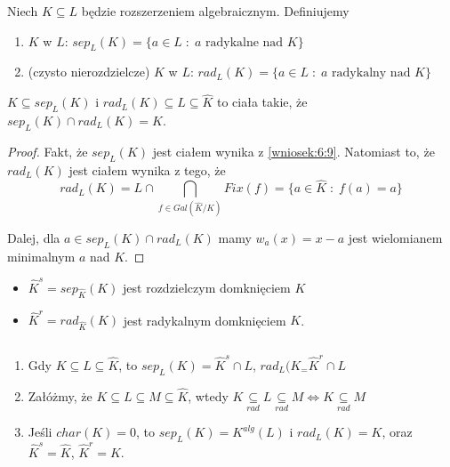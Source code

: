 \begin{bbox}
Niech $K\subseteq L$ będzie rozszerzeniem algebraicznym. Definiujemy
\begin{enumerate}
    \item {} $K$ w $L$: $sep_L(K)=\{a\in L\;:\;a\text{ radykalne nad } K\}$
    \item {} (czysto nierozdzielcze) $K$ w $L$: $rad_L(K)=\{a\in L\;:\;a\text{ radykalny nad }K\}$
\end{enumerate}
\end{bbox}

\begin{conclusion}
$K\subseteq sep_L(K)$ i $rad_L(K)\subseteq L\subseteq \hat{K}$ to ciała takie, że $sep_L(K)\cap rad_L(K)=K$.
\end{conclusion}
\begin{proof}
Fakt, że $sep_L(K)$ jest ciałem wynika z \ref{wniosek:6:9}. Natomiast to, że $rad_L(K)$ jest ciałem wynika z tego, że
$$rad_L(K)=L\cap\bigcap\limits_{f\in Gal(\hat{K}/K)}Fix(f)=\{a\in\hat{K}\;:\;f(a)=a\}$$

Dalej, dla $a\in sep_L(K)\cap rad_L(K)$ mamy $w_a(x)=x-a$ jest wielomianem minimalnym $a$ nad $K$.
\end{proof}

\begin{bbox}
\begin{itemize}%
    \item[\PHrosette] $\hat{K}^s=sep_{\hat{K}}(K)$ jest rozdzielczym domknięciem $K$
    \item[\PHrosette] $\hat{K}^r=rad_{\hat{K}}(K)$ jest radykalnym domknięciem $K$.
\end{itemize}
\end{bbox}

\begin{remark}
$ $\newline
\begin{enumerate}
    \item Gdy $K\subseteq L\subseteq\hat{K}$, to $sep_L(K)=\hat{K}^s\cap L$, $rad_L(K_=\hat{K}^r\cap L$
    \item Załóżmy, że $K\subseteq L\subseteq M\subseteq\hat{K}$, wtedy $K\underset{rad}{\subseteq}L\underset{rad}{\subseteq}M\iff K\underset{rad}{\subseteq} M$
    \item Jeśli $char(K)=0$, to $sep_L(K)=K^{alg}(L)$ i $rad_L(K)=K$, oraz $\hat{K}^s=\hat{K}$, $\hat{K}^r=K$.
\end{enumerate}
\end{remark}

